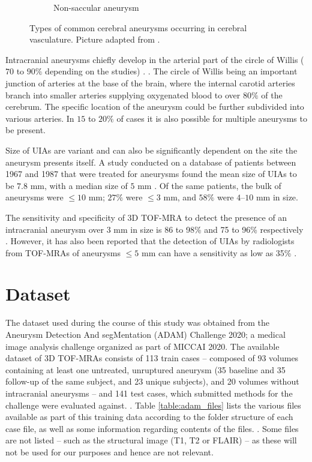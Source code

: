 \begin{figure}[h]
\begin{subfigure}{.45\linewidth}
		\caption[Non-saccular aneurysm]{Non-saccular aneurysm}
	\end{subfigure}
	\caption[Types of aneurysms.]{Types of common cerebral aneurysms occurring in cerebral vasculature. Picture adapted from \citeauthor{Withers2013}.}
	\label{fig:aneurysms.png}
\end{figure}

Intracranial aneurysms chiefly develop in the arterial part of the circle of Willis ($70$ to $90\%$ depending on the studies) \cite{Rodriguez-Regent2014}. . The circle of Willis being an important junction of arteries at the base of the brain, where the internal carotid arteries branch into smaller arteries supplying oxygenated blood to over $80\%$ of the cerebrum. The specific location of the aneurysm could be further subdivided into various arteries. In $15$ to $20\%$ of cases it is also possible for multiple aneurysms to be present.

Size of UIAs are variant and can also be significantly dependent on the site the aneurysm presents itself. A study conducted on a database of patients between 1967 and 1987 that were treated for aneurysms found the mean size of UIAs to be $7.8$ mm, with a median size of $5$ mm \cite{Weir2002}. Of the same patients, the bulk of aneurysms were $\leq 10$ mm; $27\%$ were $\leq 3$ mm, and $58\%$ were $4$--$10$ mm in size.

The sensitivity and specificity of 3D TOF-MRA to detect the presence of an intracranial aneurysm over 3 mm in size is 86 to 98\% and 75 to 96\% respectively \cite{Sailer2014}. However, it has also been reported that the detection of UIAs by radiologists from TOF-MRAs of aneurysms $\leq 5$ mm can have a sensitivity as low as 35\% \cite{White2001}.

\section{Dataset}
The dataset used during the course of this study was obtained from the Aneurysm Detection And segMentation (ADAM) Challenge 2020; a medical image analysis challenge organized as part of MICCAI 2020. The available dataset of 3D TOF-MRAs consists of 113 train cases -- composed of 93 volumes containing at least one untreated, unruptured aneurysm (35 baseline and 35 follow-up of the same subject, and 23 unique subjects), and 20 volumes without intracranial aneurysms -- and 141 test cases, which submitted methods for the challenge were evaluated against.  . Table \ref{table:adam_files} lists the various files available as part of this training data according to the folder structure of each case file, as well as some information regarding contents of the files. . Some files are not listed -- such as the structural image (T1, T2 or FLAIR) -- as these will not be used for our purposes and hence are not relevant.

